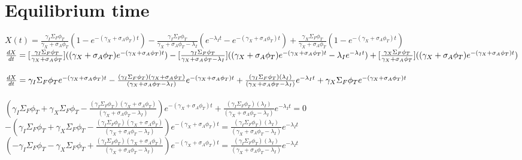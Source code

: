 \documentclass[11pt,a4paper]{article}
\begin{document}
\newpage

\section{Equilibrium time}
$X(t)=\frac{\gamma_I\Sigma_F\phi_T}{\gamma_X+\sigma_A\phi_T}(1-e^{-(\gamma_X+\sigma_A\phi_T)t})-\frac{\gamma_I\Sigma_F\phi_T}{\gamma_X+\sigma_A\phi_T-\lambda_I}(e^{-\lambda_I t}-e^{-(\gamma_X+\sigma_A\phi_T)t})+\frac{\gamma_X\Sigma_F\phi_T}{\gamma_X+\sigma_A\phi_T}(1-e^{-(\gamma_X+\sigma_A\phi_T)t})$ \\

\noindent $\frac{dX}{dt}=[\frac{\gamma_I\Sigma_F\phi_T}{\gamma_X+\sigma_A\phi_T}]((\gamma_X+\sigma_A\phi_T)e^{-(\gamma_X+\sigma_A\phi_T)t})-[\frac{\gamma_I\Sigma_F\phi_T}{\gamma_X+\sigma_A\phi_T-\lambda_I}]((\gamma_X+\sigma_A\phi_T)e^{-(\gamma_X+\sigma_A\phi_T)t}-\lambda_Ie^{-\lambda_I t}) \\ +[\frac{\gamma_X\Sigma_F\phi_T}{\gamma_X+\sigma_A\phi_T}]((\gamma_X+\sigma_A\phi_T)e^{-(\gamma_X+\sigma_A\phi_T)t})$ \\ \\

\noindent $\frac{dX}{dt}=\gamma_I\Sigma_F\phi_T e^{-(\gamma_X+\sigma_A\phi_T)t} \\
-\frac{(\gamma_I\Sigma_F\phi_T)(\gamma_X+\sigma_A\phi_T)}{(\gamma_X+\sigma_A\phi_T-\lambda_I)}e^{-(\gamma_X+\sigma_A\phi_T)t} \\
+\frac{(\gamma_I\Sigma_F\phi_T)(\lambda_I)}{(\gamma_X+\sigma_A\phi_T-\lambda_I)}e^{-\lambda_I t} \\
+\gamma_X\Sigma_F\phi_T e^{-(\gamma_X+\sigma_A\phi_T)t}$ \\ \\

\noindent $(\gamma_I\Sigma_F\phi_T+\gamma_X\Sigma_F\phi_T-\frac{(\gamma_I\Sigma_F\phi_T)(\gamma_X+\sigma_A\phi_T)}{(\gamma_X+\sigma_A\phi_T-\lambda_I)})e^{-(\gamma_X+\sigma_A\phi_T)t}+\frac{(\gamma_I\Sigma_F\phi_T)(\lambda_I)}{(\gamma_X+\sigma_A\phi_T-\lambda_I)}e^{-\lambda_I t}=0$ \\

\noindent $-(\gamma_I\Sigma_F\phi_T+\gamma_X\Sigma_F\phi_T-\frac{(\gamma_I\Sigma_F\phi_T)(\gamma_X+\sigma_A\phi_T)}{(\gamma_X+\sigma_A\phi_T-\lambda_I)})e^{-(\gamma_X+\sigma_A\phi_T)t}=\frac{(\gamma_I\Sigma_F\phi_T)(\lambda_I)}{(\gamma_X+\sigma_A\phi_T-\lambda_I)}e^{-\lambda_I t}$ \\

\noindent $(-\gamma_I\Sigma_F\phi_T-\gamma_X\Sigma_F\phi_T+\frac{(\gamma_I\Sigma_F\phi_T)(\gamma_X+\sigma_A\phi_T)}{(\gamma_X+\sigma_A\phi_T-\lambda_I)})e^{-(\gamma_X+\sigma_A\phi_T)t}=\frac{(\gamma_I\Sigma_F\phi_T)(\lambda_I)}{(\gamma_X+\sigma_A\phi_T-\lambda_I)}e^{-\lambda_I t}$ \\
\end{document}
